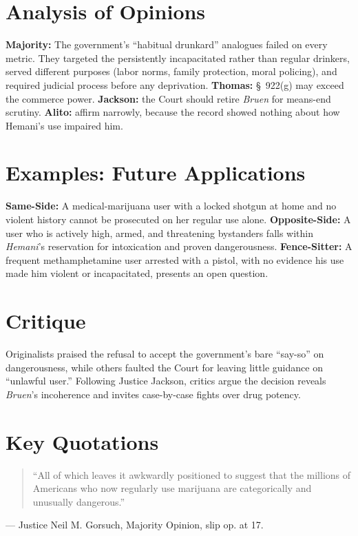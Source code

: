 \documentclass[12pt]{article}
\begin{document}
\section{Analysis of Opinions}
\textbf{Majority:} The government's ``habitual drunkard'' analogues failed on every metric. They targeted the persistently incapacitated rather than regular drinkers, served different purposes (labor norms, family protection, moral policing), and required judicial process before any deprivation. \textbf{Thomas:} \S~922(g) may exceed the commerce power. \textbf{Jackson:} the Court should retire \textit{Bruen} for means-end scrutiny. \textbf{Alito:} affirm narrowly, because the record showed nothing about how Hemani's use impaired him.

\section{Examples: Future Applications}
\textbf{Same-Side:} A medical-marijuana user with a locked shotgun at home and no violent history cannot be prosecuted on her regular use alone. \textbf{Opposite-Side:} A user who is actively high, armed, and threatening bystanders falls within \textit{Hemani}'s reservation for intoxication and proven dangerousness. \textbf{Fence-Sitter:} A frequent methamphetamine user arrested with a pistol, with no evidence his use made him violent or incapacitated, presents an open question.

\section{Critique}
Originalists praised the refusal to accept the government's bare ``say-so'' on dangerousness, while others faulted the Court for leaving little guidance on ``unlawful user.'' Following Justice Jackson, critics argue the decision reveals \textit{Bruen}'s incoherence and invites case-by-case fights over drug potency.

\section{Key Quotations}
\begin{quote}
``All of which leaves it awkwardly positioned to suggest that the millions of Americans who now regularly use marijuana are categorically and unusually dangerous.''
\end{quote}
\noindent --- Justice Neil M. Gorsuch, Majority Opinion, slip op. at 17.
\end{document}
